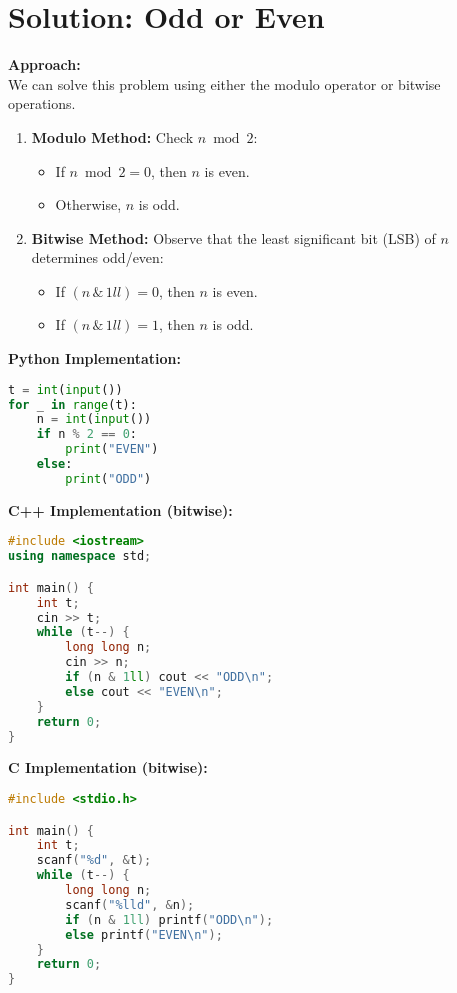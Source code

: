 \documentclass[12pt]{article}
\begin{document}
\section*{Solution: Odd or Even}

\textbf{Approach:} \\
We can solve this problem using either the modulo operator or bitwise operations.

\begin{enumerate}
    \item \textbf{Modulo Method:}  
    Check $n \bmod 2$:
    \begin{itemize}
        \item If $n \bmod 2 = 0$, then $n$ is even.
        \item Otherwise, $n$ is odd.
    \end{itemize}

    \item \textbf{Bitwise Method:}  
    Observe that the least significant bit (LSB) of $n$ determines odd/even:
    \begin{itemize}
        \item If $(n \,\&\, 1ll) = 0$, then $n$ is even.
        \item If $(n \,\&\, 1ll) = 1$, then $n$ is odd.
    \end{itemize}
\end{enumerate}

\textbf{Python Implementation:}
\begin{lstlisting}[language=Python]
t = int(input())
for _ in range(t):
    n = int(input())
    if n % 2 == 0:
        print("EVEN")
    else:
        print("ODD")
\end{lstlisting}

\textbf{C++ Implementation (bitwise):}
\begin{lstlisting}[language=C++]
#include <iostream>
using namespace std;

int main() {
    int t;
    cin >> t;
    while (t--) {
        long long n;
        cin >> n;
        if (n & 1ll) cout << "ODD\n";
        else cout << "EVEN\n";
    }
    return 0;
}
\end{lstlisting}

\textbf{C Implementation (bitwise):}
\begin{lstlisting}[language=C]
#include <stdio.h>

int main() {
    int t;
    scanf("%d", &t);
    while (t--) {
        long long n;
        scanf("%lld", &n);
        if (n & 1ll) printf("ODD\n");
        else printf("EVEN\n");
    }
    return 0;
}
\end{lstlisting}
\end{document}
